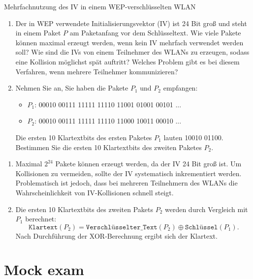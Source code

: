 \documentclass{article}
\begin{document}
\setcounter{subsection}{2228}
\begin{exercise}{Mehrfachnutzung des IV in einem WEP-verschlüsselten WLAN}
  \begin{enumerate}
    \item Der in WEP verwendete Initialisierungsvektor (IV) ist 24 Bit groß und steht in einem Paket $P$ am Paketanfang vor dem Schlüsseltext. Wie viele Pakete können maximal erzeugt werden, wenn kein IV mehrfach verwendet werden soll? Wie sind die IVs von einem Teilnehmer des WLANs zu erzeugen, sodass eine Kollision möglichst spät auftritt? Welches Problem gibt es bei diesem Verfahren, wenn mehrere Teilnehmer kommunizieren?
    \item Nehmen Sie an, Sie haben die Pakete $P_1$ und $P_2$ empfangen:
    \begin{itemize}
      \item $P_1$: 00010 00111 11111 11110 11001 01001 00101 ...
      \item $P_2$: 00010 00111 11111 11110 11000 10011 00010 ...
    \end{itemize}
    Die ersten 10 Klartextbits des ersten Paketes $P_1$ lauten 10010 01100. Bestimmen Sie die ersten 10 Klartextbits des zweiten Paketes $P_2$.
  \end{enumerate}

  \begin{solution}
    \begin{enumerate}
        \item Maximal $ 2^{24} $ Pakete können erzeugt werden, da der IV 24 Bit groß ist. Um Kollisionen zu vermeiden, sollte der IV systematisch inkrementiert werden. Problematisch ist jedoch, dass bei mehreren Teilnehmern des WLANs die Wahrscheinlichkeit von IV-Kollisionen schnell steigt.
        \item Die ersten 10 Klartextbits des zweiten Pakets $ P_2 $ werden durch Vergleich mit $ P_1 $ berechnet:
        \[
        \texttt{Klartext}(P_2) = \texttt{Verschlüsselter\_Text}(P_2) \oplus \texttt{Schlüssel}(P_1).
        \]
        Nach Durchführung der XOR-Berechnung ergibt sich der Klartext.
    \end{enumerate}
  \end{solution}
\end{exercise}



\setcounter{section}{2023}
\section{Mock exam}
\end{document}

